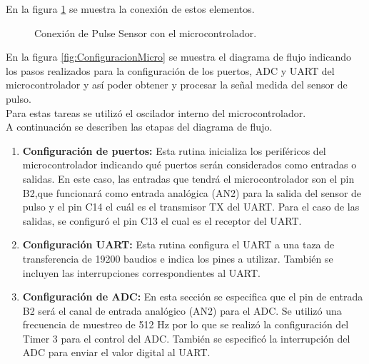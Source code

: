 En la figura \ref{fig:conexionPS} se muestra la conexión de estos elementos. \\

\begin{figure}[htbp!]
	\centering
	\caption{Conexión de Pulse Sensor con el microcontrolador.}
	\label{fig:conexionPS}
\end{figure}

En la figura \ref{fig:ConfiguracionMicro} se muestra el diagrama de flujo indicando los pasos realizados para la configuración de los puertos, ADC y UART del microcontrolador y así poder obtener y procesar la señal medida del sensor de pulso. \\

Para estas tareas se utilizó el oscilador interno del microcontrolador. \\

A continuación se describen las etapas del diagrama de flujo.

\begin{enumerate}
	\item \textbf{Configuración de puertos:} Esta rutina inicializa los periféricos del microcontrolador indicando qué puertos serán considerados como entradas o salidas. En este caso, las entradas que tendrá el microcontrolador son el pin B2,que funcionará como entrada analógica (AN2) para la salida del sensor de pulso y el pin C14 el cuál es el transmisor TX del UART. Para el caso de las salidas, se configuró el pin C13 el cual es el receptor del UART. 
	
	
	\item \textbf{Configuración UART:} Esta rutina configura el UART a una taza de transferencia de 19200 baudios e indica los pines a utilizar. También se incluyen las interrupciones correspondientes al UART.
	
	\item \textbf{Configuración de ADC:} En esta sección se especifica que el pin de entrada B2 será el canal de entrada analógico (AN2) para el ADC. Se utilizó una frecuencia de muestreo de 512 Hz por lo que se realizó la configuración del Timer 3 para el control del ADC. También se especificó la interrupción del ADC para enviar el valor digital al UART. 
	
\end{enumerate}

